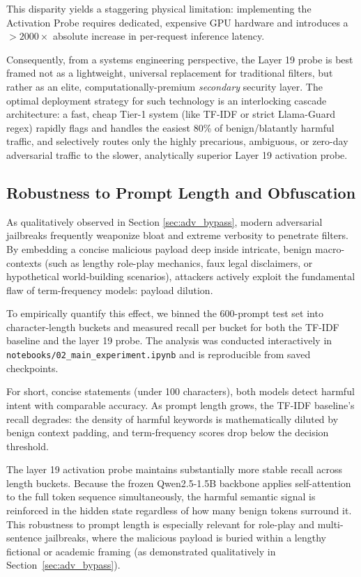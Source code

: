 \documentclass[11pt,a4paper]{article}
\begin{document}
This disparity yields a staggering physical limitation: implementing the Activation Probe requires dedicated, expensive GPU hardware and introduces a $>2000\times$ absolute increase in per-request inference latency. 

Consequently, from a systems engineering perspective, the Layer 19 probe is best framed not as a lightweight, universal replacement for traditional filters, but rather as an elite, computationally-premium \emph{secondary} security layer. The optimal deployment strategy for such technology is an interlocking cascade architecture: a fast, cheap Tier-1 system (like TF-IDF or strict Llama-Guard regex) rapidly flags and handles the easiest 80\% of benign/blatantly harmful traffic, and selectively routes only the highly precarious, ambiguous, or zero-day adversarial traffic to the slower, analytically superior Layer 19 activation probe.

\subsection{Robustness to Prompt Length and Obfuscation}
\label{sec:prompt_length}

As qualitatively observed in Section \ref{sec:adv_bypass}, modern adversarial jailbreaks frequently weaponize bloat and extreme verbosity to penetrate filters. By embedding a concise malicious payload deep inside intricate, benign macro-contexts (such as lengthy role-play mechanics, faux legal disclaimers, or hypothetical world-building scenarios), attackers actively exploit the fundamental flaw of term-frequency models: payload dilution.

To empirically quantify this effect, we binned the 600-prompt test set into
character-length buckets and measured recall per bucket for both the TF-IDF
baseline and the layer 19 probe. The analysis was conducted interactively in
\texttt{notebooks/02\_main\_experiment.ipynb} and is reproducible from saved
checkpoints.

For short, concise statements (under 100 characters), both models detect harmful
intent with comparable accuracy. As prompt length grows, the TF-IDF baseline's
recall degrades: the density of harmful keywords is mathematically diluted by
benign context padding, and term-frequency scores drop below the decision threshold.

The layer 19 activation probe maintains substantially more stable recall across
length buckets. Because the frozen Qwen2.5-1.5B backbone applies self-attention
to the full token sequence simultaneously, the harmful semantic signal is
reinforced in the hidden state regardless of how many benign tokens surround it.
This robustness to prompt length is especially relevant for role-play and
multi-sentence jailbreaks, where the malicious payload is buried within a lengthy
fictional or academic framing (as demonstrated qualitatively in
Section~\ref{sec:adv_bypass}).
\end{document}
